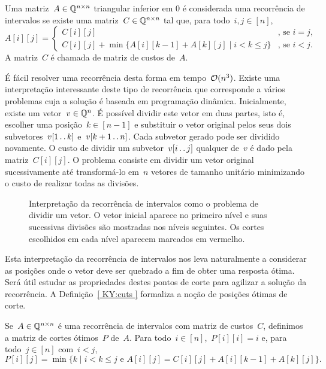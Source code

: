 \begin{defi} \label{ KY:recint }
Uma matriz~$A \in \mathbb{Q}^{n \times n}$ triangular inferior em 0 é considerada uma recorrência de intervalos se existe uma matriz~$C \in \mathbb{Q}^{n \times n}$ tal que, para todo~$i,j \in [n]$,
\begin{equation*}
A[i][j] = \begin{cases}
C[i][j]                                                           & \text{, se } i = j \text{, }  \\
C[i][j] + \min\{A[i][k-1] + A[k][j] \mid i < k \leq j \}          & \text{, se } i < j \text{.}
\end{cases}
\end{equation*}
A matriz~$C$ é chamada de matriz de custos de~$A$.
\end{defi}

É fácil resolver uma recorrência desta forma em tempo~$\mathcal{O}(n^3)$. Existe uma interpretação interessante deste tipo de recorrência que corresponde a vários problemas cuja a solução é baseada em programação dinâmica. Inicialmente, existe um vetor~$v \in \mathbb{Q}^n$. É possível dividir este vetor em duas partes, isto é, escolher uma posição~$k \in [n-1]$ e substituir o vetor original pelos seus dois subvetores~$v[1 \,.\,.\, k]$ e~$v[k+1 \,.\,.\, n]$. Cada subvetor gerado pode ser dividido novamente. O custo de dividir um subvetor~$v[i \,.\,.\, j]$ qualquer de~$v$ é dado pela matriz~$C[i][j]$. O problema consiste em dividir um vetor original sucessivamente até transformá-lo em~$n$ vetores de tamanho unitário minimizando o custo de realizar todas as divisões.

\begin{figure}[h]
    \centering
    
    \caption{Interpretação da recorrência de intervalos como o problema de dividir um vetor. O vetor inicial aparece no primeiro nível e suas sucessivas divisões são mostradas nos níveis seguintes. Os cortes escolhidos em cada nível aparecem marcados em vermelho.} \label{ KY:Interp }
\end{figure}

Esta interpretação da recorrência de intervalos nos leva naturalmente a considerar as posições onde o vetor deve ser quebrado a fim de obter uma resposta ótima. Será útil estudar as propriedades destes pontos de corte para agilizar a solução da recorrência. A Definição~\ref{ KY:cuts } formaliza a noção de posições ótimas de corte.

\begin{defi} \label{ KY:cuts }
Se~$A \in \mathbb{Q}^{n \times n}$ é uma recorrência de intervalos com matriz de custos~$C$, definimos a matriz de cortes ótimos~$P$ de~$A$. Para todo~$i \in [n]$,~$P[i][i] = i$ e, para todo~$j \in [n]$ com~$i < j$, 
$$P[i][j] = \min\{k \mid i < k \leq j \text{ e } A[i][j] = C[i][j] + A[i][k-1] + A[k][j]\} \text{.}$$
\end{defi}

